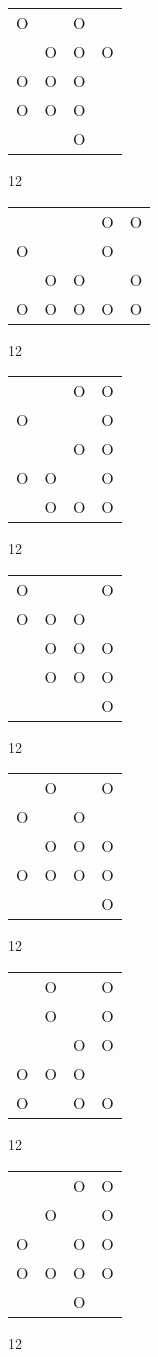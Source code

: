 \begin{tabular}{|m{0.2cm}m{0.2cm}m{0.2cm}m{0.2cm}|}\hline
O& &O& \\
 &O&O&O\\
O&O&O& \\
O&O&O& \\
 & &O& \\
\hline\end{tabular}12
\begin{tabular}{|m{0.2cm}m{0.2cm}m{0.2cm}m{0.2cm}m{0.2cm}|}\hline
 & & &O&O\\
O& & &O& \\
 &O&O& &O\\
O&O&O&O&O\\
\hline\end{tabular}12
\begin{tabular}{|m{0.2cm}m{0.2cm}m{0.2cm}m{0.2cm}|}\hline
 & &O&O\\
O& & &O\\
 & &O&O\\
O&O& &O\\
 &O&O&O\\
\hline\end{tabular}12
\begin{tabular}{|m{0.2cm}m{0.2cm}m{0.2cm}m{0.2cm}|}\hline
O& & &O\\
O&O&O& \\
 &O&O&O\\
 &O&O&O\\
 & & &O\\
\hline\end{tabular}12
\begin{tabular}{|m{0.2cm}m{0.2cm}m{0.2cm}m{0.2cm}|}\hline
 &O& &O\\
O& &O& \\
 &O&O&O\\
O&O&O&O\\
 & & &O\\
\hline\end{tabular}12
\begin{tabular}{|m{0.2cm}m{0.2cm}m{0.2cm}m{0.2cm}|}\hline
 &O& &O\\
 &O& &O\\
 & &O&O\\
O&O&O& \\
O& &O&O\\
\hline\end{tabular}12
\begin{tabular}{|m{0.2cm}m{0.2cm}m{0.2cm}m{0.2cm}|}\hline
 & &O&O\\
 &O& &O\\
O& &O&O\\
O&O&O&O\\
 & &O& \\
\hline\end{tabular}12
